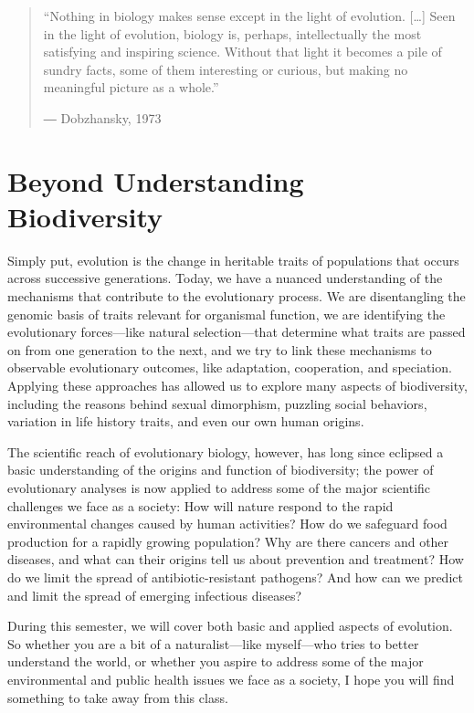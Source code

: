 \documentclass[
]{book}
\begin{document}
\begin{quote}
``Nothing in biology makes sense except in the light of evolution. {[}\ldots{]} Seen in the light of evolution, biology is, perhaps, intellectually the most satisfying and inspiring science. Without that light it becomes a pile of sundry facts, some of them interesting or curious, but making no meaningful picture as a whole.''

― Dobzhansky, 1973
\end{quote}

\hypertarget{beyond-understanding-biodiversity}{%
\section*{Beyond Understanding Biodiversity}\label{beyond-understanding-biodiversity}}

Simply put, evolution is the change in heritable traits of populations that occurs across successive generations. Today, we have a nuanced understanding of the mechanisms that contribute to the evolutionary process. We are disentangling the genomic basis of traits relevant for organismal function, we are identifying the evolutionary forces---like natural selection---that determine what traits are passed on from one generation to the next, and we try to link these mechanisms to observable evolutionary outcomes, like adaptation, cooperation, and speciation. Applying these approaches has allowed us to explore many aspects of biodiversity, including the reasons behind sexual dimorphism, puzzling social behaviors, variation in life history traits, and even our own human origins.

The scientific reach of evolutionary biology, however, has long since eclipsed a basic understanding of the origins and function of biodiversity; the power of evolutionary analyses is now applied to address some of the major scientific challenges we face as a society: How will nature respond to the rapid environmental changes caused by human activities? How do we safeguard food production for a rapidly growing population? Why are there cancers and other diseases, and what can their origins tell us about prevention and treatment? How do we limit the spread of antibiotic-resistant pathogens? And how can we predict and limit the spread of emerging infectious diseases?

During this semester, we will cover both basic and applied aspects of evolution. So whether you are a bit of a naturalist---like myself---who tries to better understand the world, or whether you aspire to address some of the major environmental and public health issues we face as a society, I hope you will find something to take away from this class.
\end{document}
